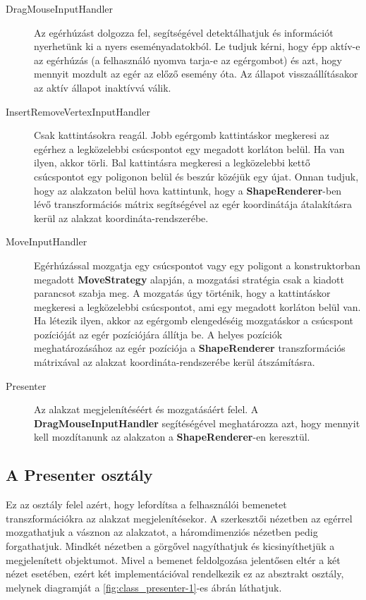 \begin{description}
    \item[DragMouseInputHandler] Az egérhúzást dolgozza fel, segítségével detektálhatjuk és információt nyerhetünk ki a nyers eseményadatokból. Le tudjuk kérni, hogy épp aktív-e az egérhúzás (a felhasználó nyomva tarja-e az egérgombot) és azt, hogy mennyit mozdult az egér az előző esemény óta. Az állapot visszaállításakor az aktív állapot inaktívvá válik.
    \item[InsertRemoveVertexInputHandler] Csak kattintásokra reagál. Jobb egérgomb kattintáskor megkeresi az egérhez a legközelebbi csúcspontot egy megadott korláton belül. Ha van ilyen, akkor törli. Bal kattintásra megkeresi a legközelebbi kettő csúcspontot egy poligonon belül és beszúr közéjük egy újat. Onnan tudjuk, hogy az alakzaton belül hova kattintunk, hogy a \textbf{ShapeRenderer}-ben lévő transzformációs mátrix segítségével az egér koordinátája átalakításra kerül az alakzat koordináta-rendszerébe.
    \item[MoveInputHandler] Egérhúzással mozgatja egy csúcspontot vagy egy poligont a konstruktorban megadott \textbf{MoveStrategy} alapján, a mozgatási stratégia csak a kiadott parancsot szabja meg. A mozgatás úgy történik, hogy a kattintáskor megkeresi a legközelebbi csúcspontot, ami egy megadott korláton belül van. Ha létezik ilyen, akkor az egérgomb elengedéséig mozgatáskor a csúcspont pozícióját az egér pozíciójára állítja be. A helyes pozíciók meghatározásához az egér pozíciója a \textbf{ShapeRenderer} transzformációs mátrixával az alakzat koordináta-rendszerébe kerül átszámításra.
    \item[Presenter] Az alakzat megjelenítéséért és mozgatásáért felel. A \textbf{DragMouseInputHandler} segítéségével meghatározza azt, hogy mennyit kell mozdítanunk az alakzaton a \textbf{ShapeRenderer}-en keresztül.
\end{description}

\subsection{A Presenter osztály}

Ez az osztály felel azért, hogy lefordítsa a felhasználói bemenetet transzformációkra az alakzat megjelenítésekor. A szerkesztői nézetben az egérrel mozgathatjuk a vásznon az alakzatot, a háromdimenziós nézetben pedig forgathatjuk. Mindkét nézetben a görgővel nagyíthatjuk és kicsinyíthetjük a megjelenített objektumot. Mivel a bemenet feldolgozása jelentősen eltér a két nézet esetében, ezért két implementációval rendelkezik ez az absztrakt osztály, melynek diagramját a \ref{fig:class_presenter-1}-es ábrán láthatjuk.

